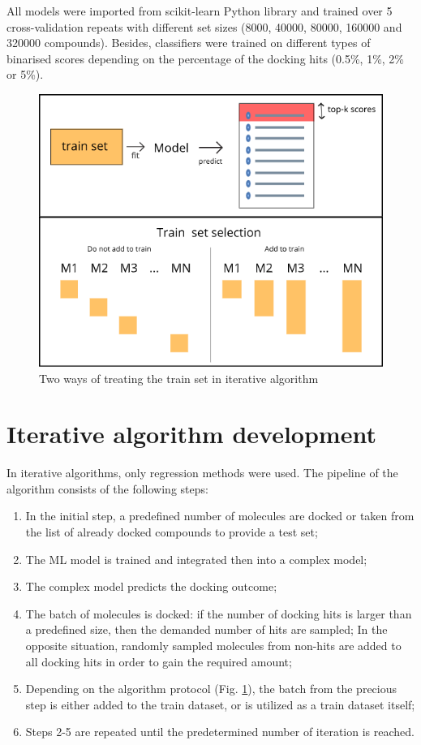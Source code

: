 All models were imported from scikit-learn Python library and trained over 5 cross-validation repeats with different set sizes (8000, 40000, 80000, 160000 and 320000 compounds).
Besides, classifiers were trained on different types of binarised scores depending on the percentage of the docking hits (0.5\%, 1\%, 2\% or 5\%).

\begin{figure}
    \centering
    \includegraphics[scale=0.7]{Images/image1.png}
    \caption{Two ways of treating the train set in iterative algorithm}
    \label{TrainSetSelection}
\end{figure}

\section{Iterative algorithm development}

In iterative algorithms, only regression methods were used.
The pipeline of the algorithm consists of the following steps:
\begin{enumerate}
    \item In the initial step, a predefined number of molecules are docked or taken from the list of already docked compounds to provide a test set;
    \item The ML model is trained and integrated then into a complex model;
    \item The complex model predicts the docking outcome;
    \item The batch of molecules is docked: if the number of docking hits is larger than a predefined size, then the demanded number of hits are sampled;
    In the opposite situation, randomly sampled molecules from non-hits are added to all docking hits in order to gain the required amount;
    \item Depending on the algorithm protocol (Fig. \ref{TrainSetSelection}), the batch from the precious step is either added to the train dataset, or is utilized as a train dataset itself;
    \item Steps 2-5 are repeated until the predetermined number of iteration is reached.
\end{enumerate}

